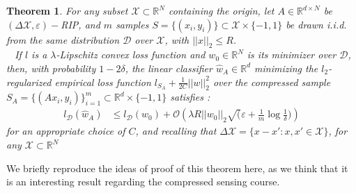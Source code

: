 \documentclass{article}
\newcommand{\R}{\mathbb R}
\newtheorem{theorem}{Theorem}[section]
\begin{document}
\begin{theorem}
    For any subset $\mathcal{X}\subset \R^N$ containing the origin, 
    let $A\in \R^{d\times N}$ be $(\Delta \mathcal{X}, \varepsilon)-$RIP, and $m$ 
    samples $S=\{ (x_i, y_i)\} \subset \mathcal{X}\times \{-1, 1\}$
    be drawn i.i.d. from the same distribution $\mathcal{D}$ over 
    $\mathcal{X}$, with $||x||_2 \leq R$. \\ 
    If $l$ is a $\lambda$-Lipschitz convex loss function and $w_0\in \R^N$
    is its minimizer over $\mathcal{D}$, then, with probability
    $1-2\delta$, the linear classifier $\hat{w}_A\in \R^d$ minimizing the 
    $l_2$-regularized empirical loss function $l_{S_A}+\frac{1}{2C} ||w||_2^2$
    over the compressed sample $S_A = \{(Ax_i, y_i) \}_{i=1}^m
    \subset \R^d \times \{-1, 1\} $ satisfies :
    \begin{align}
        l_{\mathcal{D}}(\hat{w}_A) &\leq 
        l_{\mathcal{D}}(w_0) + \mathcal{O}
        \left ( 
            \lambda R ||w_0||_2 \sqrt(\varepsilon + \frac{1}{m}\log\frac{1}{\delta})
        \right )
    \end{align}
    for an appropriate choice of $C$, and recalling that
     $\Delta \mathcal{X} = \{x-x' : x, x' \in \mathcal{X} \}$, for 
     any $\mathcal{X}\subset \R^N$
\end{theorem}
We briefly reproduce the ideas of proof of this theorem here, as we think that it is 
an interesting result regarding the compressed sensing course. 
\end{document}
